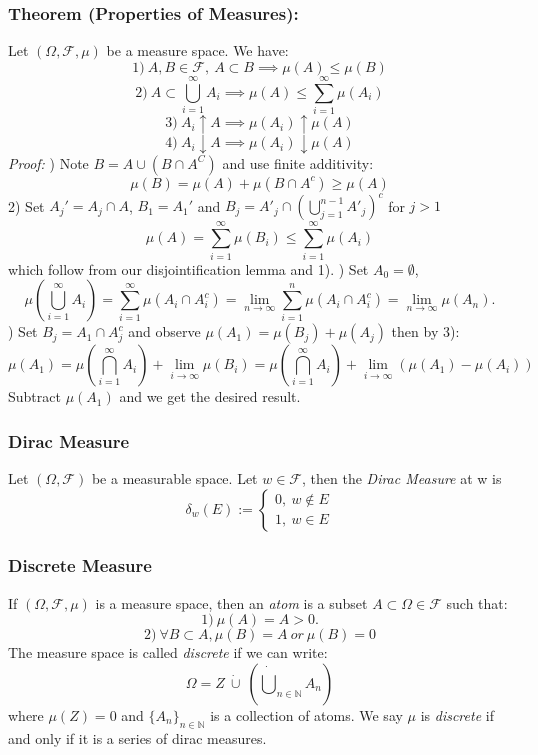 \documentclass{article}
\begin{document}
\subsubsection{Theorem (Properties of Measures):}
Let  $(\Omega, \mathcal{F}, \mu)$ be a measure space. We have: 
\[
1) \ A,B\in\mathcal{F}, \ A\subset B \implies \mu(A)\leq\mu(B)
\]
\[
2) \ A\subset \bigcup_{i=1}^{\infty}A_i \implies \mu(A)\leq\sum_{i=1}^{\infty}\mu(A_i)
\]
\[
3) \ A_i \uparrow A \implies \mu(A_i)\uparrow \mu(A)
\]
\[
4) \ A_i \downarrow A \implies \mu(A_i) \downarrow\mu(A)
\]
\textit{Proof:} \newline {}) Note $B = A \cup (B\cap A^C)$ and use finite additivity: 
\[
\mu(B) = \mu(A)+\mu(B \cap A^c) \geq\mu(A)
\]
2) Set $A_j' = A_j \cap A$, $B_1=A_1'$ and $B_j=A'_j\cap(\bigcup_{j=1}^{n-1}A'_j)^c$ for $j>1$
\[
\mu(A) =  \sum_{i=1}^{\infty}\mu(B_i) \leq  \sum_{i=1}^{\infty}\mu(A_i)
\]
which follow from our disjointification lemma and 1). \newline {}) Set $A_0 = \emptyset$, 
\[
\mu(\bigcup_{i=1}^{\infty}A_i) = \sum_{i=1}^{\infty} \mu(A_i \cap A_i^c) =\lim_{n\to \infty}\sum_{i=1}^{n}\mu(A_i \cap A_i^c) = \lim_{n\to \infty}\mu(A_n).
\]\newline {}) Set $B_j= A_1\cap A_j^c$ and observe $\mu(A_1) = \mu(B_j)+\mu(A_j)$ then by 3):
\[
\mu(A_1) = \mu(\bigcap_{i=1}^{\infty}A_i) +\lim_{i\to \infty}\mu(B_i)= \mu(\bigcap_{i=1}^{\infty}A_i)+\lim_{i\to \infty}(\mu(A_1)-\mu(A_i))
\]
Subtract $\mu(A_1)$ and we get the desired result.
\subsubsection{Dirac Measure}
Let $(\Omega, \mathcal{F})$ be a measurable space. Let $w\in \mathcal{F}$, then the \emph{Dirac Measure} at w is 
\[
\delta_w(E):=\begin{cases}
0, \ w\notin E\\
1, \ w \in E
\end{cases}
\]


\subsubsection{Discrete Measure}
If $(\Omega, \mathcal{F}, \mu)$ is a measure space, then an \emph{atom}  is a subset $A \subset\Omega\in \mathcal{F}$ such that: 
\[
1) \ \mu(A) = A > 0.
\]
\[
2) \ \forall B \subset A, \mu(B)=A \ or \ \mu(B)=0
\]
The measure space is called \emph{discrete} if we can write: 
\[
\Omega = Z \ \dot{\cup} \ (\dot{\bigcup}_{n\in \mathbb{N}}A_n)
\]
where $\mu(Z) = 0$ and $\{A_n\}_{n \in \mathbb{N}}$ is a collection of atoms. \newline \newline
We say $\mu$ is \emph{discrete} if and only if it is a series of dirac measures.
\end{document}
